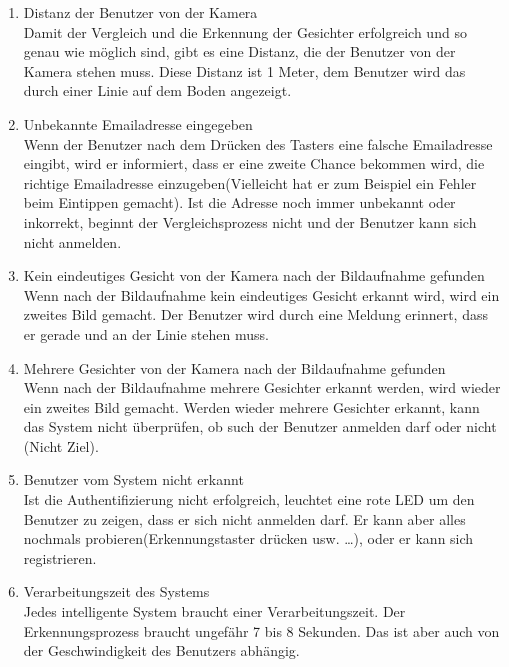 \begin{enumerate}
	\item Distanz der Benutzer von der Kamera \\
	
	Damit der Vergleich und die Erkennung der Gesichter erfolgreich und so genau wie möglich sind, gibt es eine Distanz, die der Benutzer von der Kamera stehen muss. Diese Distanz ist 1 Meter, dem Benutzer wird das durch einer Linie auf dem Boden angezeigt.
	\item Unbekannte Emailadresse eingegeben \\
	
	Wenn der Benutzer nach dem Drücken des Tasters eine falsche Emailadresse eingibt, wird er informiert, dass er eine zweite Chance bekommen wird, die richtige Emailadresse einzugeben(Vielleicht hat er zum Beispiel ein Fehler beim Eintippen gemacht). Ist die Adresse noch immer unbekannt oder inkorrekt, beginnt der Vergleichsprozess nicht und der Benutzer kann sich nicht anmelden.
	
	\item Kein eindeutiges Gesicht von der Kamera nach der Bildaufnahme gefunden \\
	
	Wenn nach der Bildaufnahme kein eindeutiges Gesicht erkannt wird, wird ein zweites Bild gemacht. Der Benutzer wird durch eine Meldung erinnert, dass er gerade und an der Linie stehen muss.
	
	\item Mehrere Gesichter von der Kamera nach der Bildaufnahme gefunden \\
	
	Wenn nach der Bildaufnahme mehrere Gesichter erkannt werden, wird wieder ein zweites Bild gemacht. Werden wieder mehrere Gesichter erkannt, kann das System nicht überprüfen, ob such der Benutzer anmelden darf oder nicht (Nicht Ziel).
	
	\item Benutzer vom System nicht erkannt \\
	
	Ist die Authentifizierung nicht erfolgreich, leuchtet eine rote LED um den Benutzer zu zeigen, dass er sich nicht anmelden darf. Er kann aber alles nochmals probieren(Erkennungstaster drücken usw. …), oder er kann sich registrieren.
	\item Verarbeitungszeit des Systems \\
	
	Jedes intelligente System braucht einer Verarbeitungszeit. Der Erkennungsprozess braucht ungefähr 7 bis 8 Sekunden. Das ist aber auch von der Geschwindigkeit des Benutzers abhängig.
\end{enumerate}
